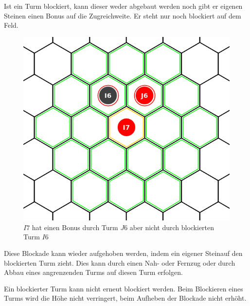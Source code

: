 Ist ein Turm blockiert, kann dieser weder abgebaut werden noch gibt er eigenen Steinen einen Bonus auf die Zugreichweite. Er steht nur noch blockiert auf dem Feld. 

\begin{figure}[ht]
\begin{center}
\includegraphics[scale=0.25]{graphic/range-blockedbonus.png} \\
\smallskip
{\footnotesize $I7$ hat einen Bonus durch Turm $J6$ aber nicht durch blockierten Turm $I6$}
\end{center}
\end{figure}

Diese Blockade kann wieder aufgehoben werden, indem ein eigener Steinauf den blockierten Turm zieht. Dies kann durch einen Nah- oder Fernzug oder durch Abbau eines angrenzenden Turms auf diesen Turm erfolgen.

Ein blockierter Turm kann nicht erneut blockiert werden. Beim Blockieren eines Turms wird die Höhe nicht verringert, beim Aufheben der Blockade nicht erhöht.

\newpage

